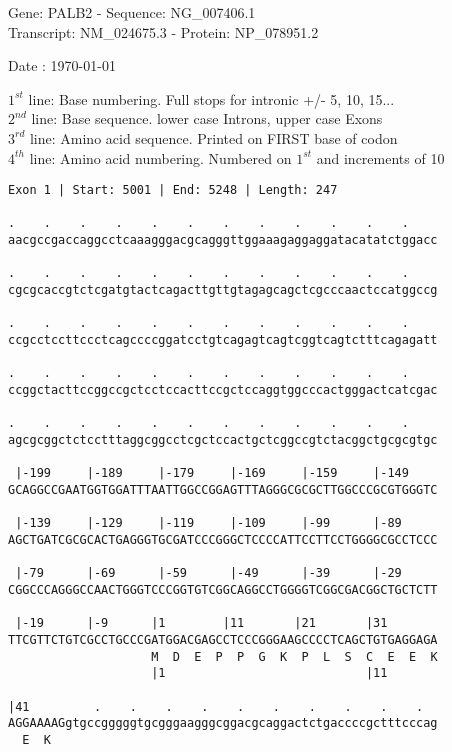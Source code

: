 \documentclass{article}
\begin{document}
\begin{center}
\begin{large}
Gene: PALB2 - Sequence: NG\_007406.1\\
Transcript: NM\_024675.3 - Protein: NP\_078951.2
 
 Date : \today
\end{large}
\end{center}
$1^{st}$ line: Base numbering. Full stops for intronic +/- 5, 10, 15...\\
$2^{nd}$ line: Base sequence. lower case Introns, upper case Exons\\
$3^{rd}$ line: Amino acid sequence. Printed on FIRST base of codon\\
$4^{th}$ line: Amino acid numbering. Numbered on $1^{st}$ and increments of 10\\
\begin{Verbatim}[fontfamily=courier]
Exon 1 | Start: 5001 | End: 5248 | Length: 247

.    .    .    .    .    .    .    .    .    .    .    .    
aacgccgaccaggcctcaaagggacgcagggttggaaagaggaggatacatatctggacc

.    .    .    .    .    .    .    .    .    .    .    .    
cgcgcaccgtctcgatgtactcagacttgttgtagagcagctcgcccaactccatggccg

.    .    .    .    .    .    .    .    .    .    .    .    
ccgcctccttccctcagccccggatcctgtcagagtcagtcggtcagtctttcagagatt

.    .    .    .    .    .    .    .    .    .    .    .    
ccggctacttccggccgctcctccacttccgctccaggtggcccactgggactcatcgac

.    .    .    .    .    .    .    .    .    .    .    .    
agcgcggctctcctttaggcggcctcgctccactgctcggccgtctacggctgcgcgtgc

 |-199     |-189     |-179     |-169     |-159     |-149    
GCAGGCCGAATGGTGGATTTAATTGGCCGGAGTTTAGGGCGCGCTTGGCCCGCGTGGGTC

 |-139     |-129     |-119     |-109     |-99      |-89     
AGCTGATCGCGCACTGAGGGTGCGATCCCGGGCTCCCCATTCCTTCCTGGGGCGCCTCCC

 |-79      |-69      |-59      |-49      |-39      |-29     
CGGCCCAGGGCCAACTGGGTCCCGGTGTCGGCAGGCCTGGGGTCGGCGACGGCTGCTCTT

 |-19      |-9      |1        |11       |21       |31       
TTCGTTCTGTCGCCTGCCCGATGGACGAGCCTCCCGGGAAGCCCCTCAGCTGTGAGGAGA
                    M  D  E  P  P  G  K  P  L  S  C  E  E  K
                    |1                            |11       

|41         .    .    .    .    .    .    .    .    .    .  
AGGAAAAGgtgccgggggtgcgggaagggcggacgcaggactctgaccccgctttcccag
  E  K                                                      

\end{Verbatim}
\end{document}
